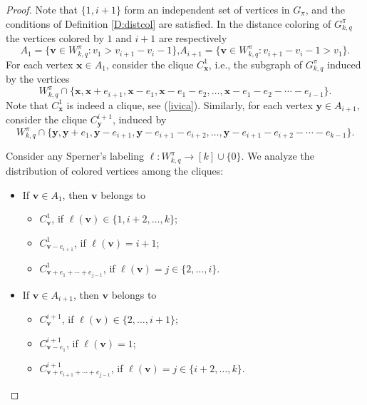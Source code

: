 \documentclass{birkjour}
\theoremstyle{definition}
\theoremstyle{remark}
\numberwithin{equation}{section}
\begin{document}
\begin{proof}
Note that $\{1,i+1\}$ form an independent set of vertices in
$G_\pi$, and the conditions of Definition \ref{D:distcol} are
satisfied. In the distance coloring of $G^{\pi}_{k,q}$ the vertices
colored by $1$ and $i+1$ are respectively
$$A_1=\{\mathbf{v}\in W_{k,q}^\pi:v_1>v_{i+1}-v_i-1\}\textrm{,
}A_{i+1}=\{\mathbf{v}\in W_{k,q}^\pi:v_{i+1}-v_i-1>v_1\}.$$
 For
each vertex $\mathbf{x}\in A_1$, consider the clique $C^1_\mathbf{x}$, i.e.,
the subgraph of $G^{\pi}_{k,q}$ induced by the vertices
$$W^\pi_{k,q}\cap\{\mathbf{x},\mathbf{x}+e_{i+1},\mathbf{x}-e_1,
\mathbf{x}-e_1-e_2,\ldots,\mathbf{x}-e_1-e_2-\cdots-e_{i-1}\} .$$
Note that $C_\mathbf{x}^1$ is indeed a clique, see (\ref{ivica}).
 Similarly, for
each vertex $\mathbf{y}\in A_{i+1}$, consider the clique
$C^{i+1}_\mathbf{y}$, induced by
$$W^\pi_{k,q}\cap \{\mathbf{y},\mathbf{y}+e_1,\mathbf{y}-e_{i+1},
\mathbf{y}-e_{i+1}-e_{i+2}, \ldots,
\mathbf{y}-e_{i+1}-e_{i+2}-\cdots-e_{k-1}\} .$$


Consider any Sperner's labeling \(\ell : W^\pi_{k,q} \to [k] \cup
\{0\}\). We analyze the distribution of colored vertices among the
cliques:

\begin{itemize}
\item If \(\mathbf{v} \in A_1\), then \(\mathbf{v}\) belongs to
\begin{itemize}
    \item \(C^1_\mathbf{v}\), if \(\ell(\mathbf{v}) \in \{1, i+2, \ldots, k\}\);
    \item \(C^1_{\mathbf{v} - e_{i+1}}\), if \(\ell(\mathbf{v}) = i+1\);
    \item \(C^1_{\mathbf{v} + e_1 + \cdots + e_{j-1}}\), if \(\ell(\mathbf{v}) = j \in \{2, \ldots, i\}\).
\end{itemize}

\item If \(\mathbf{v} \in A_{i+1}\), then \(\mathbf{v}\) belongs
to
\begin{itemize}
    \item \(C^{i+1}_\mathbf{v}\), if \(\ell(\mathbf{v}) \in \{2, \ldots, i+1\}\);
    \item \(C^{i+1}_{\mathbf{v} - e_1}\), if \(\ell(\mathbf{v}) = 1\);
    \item \(C^{i+1}_{\mathbf{v} + e_{i+1} + \cdots + e_{j-1}}\), if \(\ell(\mathbf{v}) = j \in \{i+2, \ldots, k\}\).
\end{itemize}


\end{itemize}
\end{proof}
\end{document}
